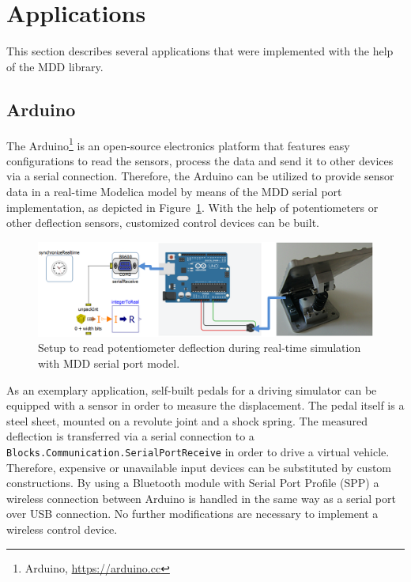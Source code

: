 \documentclass{resources/modelica}
\newcommand{\modelica}[1]{\lstinline[language=modelica]|#1|}
\begin{document}
\section{Applications}
\label{sec:Applications}

This section describes several applications that were implemented with the
help of the MDD library.

\subsection{Arduino}

The Arduino\footnote{Arduino, \url{https://arduino.cc}} is an open-source electronics platform that features easy configurations to read the sensors, process the data and send it to other devices via a serial connection.
Therefore, the Arduino can be utilized to provide sensor data in a real-time Modelica model by means of the MDD serial port implementation, as depicted in Figure~\ref{fig:arduino}.
With the help of potentiometers or other deflection sensors, customized control devices can be built.
\begin{figure}[h]
  \centering
  \includegraphics[width=0.9\columnwidth]{figures/arduino}
  \caption{Setup to read potentiometer deflection during real-time simulation with MDD serial port model\protect\footnotemark.}
  \label{fig:arduino}
\end{figure}

\noindent
As an exemplary application, self-built pedals for a driving simulator can be equipped with a sensor in order to measure the displacement. The pedal itself is a steel sheet, mounted on a revolute joint and a shock spring.
The measured deflection is transferred via a serial connection to a \modelica{Blocks.Communication.SerialPortReceive} in order to drive a virtual vehicle.
Therefore, expensive or unavailable input devices can be substituted by custom constructions.
By using a Bluetooth module with Serial Port Profile (SPP) a wireless connection between Arduino is handled in the same way as a serial port over USB connection.
No further modifications are necessary to implement a wireless control device.
\end{document}
